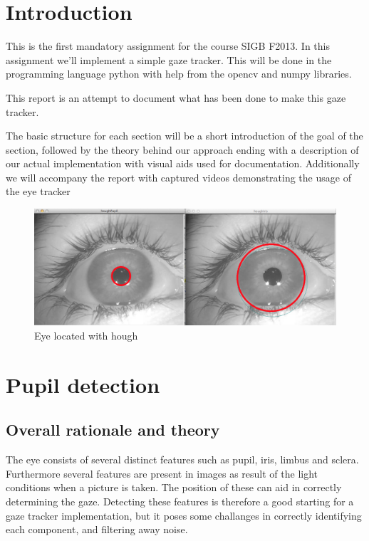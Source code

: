 \section{Introduction}

This is the first mandatory assignment for the course SIGB F2013. In
this assignment we'll implement a simple gaze tracker. This will be done
in the programming language python with help from the opencv and numpy
libraries.

This report is an attempt to document what has been done to make this
gaze tracker.

The basic structure for each section will be a short introduction of the
goal of the section, followed by the theory behind our approach ending
with a description of our actual implementation with visual aids used
for documentation. Additionally we will accompany the report with
captured videos demonstrating the usage of the eye tracker

\begin{figure}[htbp]
\centering
\includegraphics{pics/houghtransform.png}
\caption{Eye located with hough}
\end{figure}

\section{Pupil detection}

\subsection{Overall rationale and theory}

The eye consists of several distinct features such as pupil, iris,
limbus and sclera. Furthermore several features are present in images as
result of the light conditions when a picture is taken. The position of
these can aid in correctly determining the gaze. Detecting these
features is therefore a good starting for a gaze tracker implementation,
but it poses some challanges in correctly identifying each component,
and filtering away noise.

